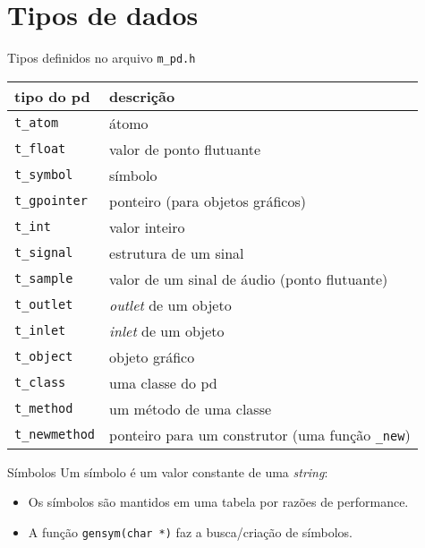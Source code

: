 \section{Tipos de dados}


\begin{frame}{Tipos definidos no arquivo \texttt{m\_pd.h}}
\begin{center}
\begin{tabular}{|l|l|}
\hline
tipo do pd & descrição \\
\hline
\texttt{t\_atom} & átomo \\
\texttt{t\_float} & valor de ponto flutuante \\
\texttt{t\_symbol} & símbolo \\
\texttt{t\_gpointer} & ponteiro (para objetos gráficos) \\
\texttt{t\_int} & valor inteiro \\
\texttt{t\_signal} & estrutura de um sinal \\
\texttt{t\_sample} & valor de um sinal de áudio (ponto flutuante) \\
\texttt{t\_outlet} & \emph{outlet} de um objeto \\
\texttt{t\_inlet} & \emph{inlet} de um objeto \\
\texttt{t\_object} & objeto gráfico \\
\texttt{t\_class} & uma classe do pd \\
\texttt{t\_method} & um método de uma classe \\
\texttt{t\_newmethod} & ponteiro para um construtor (uma função \texttt{\_new}) \\
\hline
\end{tabular}
\end{center}
\end{frame}


\begin{frame}{Símbolos}
Um símbolo é um valor constante de uma \emph{string}:
\begin{itemize}
\item Os símbolos são mantidos em uma tabela por razões de performance.
\item A função \texttt{gensym(char *)} faz a busca/criação de símbolos.
\end{itemize}
\end{frame}


